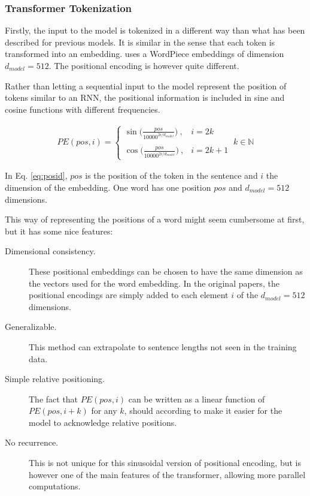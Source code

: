 \subsubsection{Transformer Tokenization}\label{sec:transtok}

Firstly, the input to the model is tokenized in a different way than what has been described for previous models. It is similar in the sense that each token is transformed into an embedding. \citet{NIPS2017_7181} uses a WordPiece embeddings of dimension $d_{model} = 512$. The positional encoding is however quite different. 

Rather than letting a sequential input to the model represent the position of tokens similar to an RNN, the positional information is included in sine and cosine functions with different frequencies. 

\begin{align}
    PE(pos,i) = \begin{cases}
    \sin\displaystyle{\Big(\frac{pos}{10000^{2i/d_{model}}}\Big)} \ , & i = 2k \\
    \\
    \cos\displaystyle{\Big(\frac{pos}{10000^{2i/d_{model}}}\Big) }\ , & i = 2k + 1 
    \end{cases} \   k \in \mathbb{N}
    \label{eq:posid}
\end{align}

In Eq. \ref{eq:posid}, $pos$ is the position of the token in the sentence and $i$ the dimension of the embedding. One word has one position $pos$ and $d_{model} = 512$ dimensions.

This way of representing the positions of a word might seem cumbersome at first, but it has some nice features: 

\begin{description}
    \item[Dimensional consistency.] These positional embeddings can be chosen to have the same dimension as the vectors used for the word embedding. In the original papers, the positional encodings are simply added to each element $i$ of the $d_{model} = 512$ dimensions. 
    \item[Generalizable.] This method can extrapolate to sentence lengths not seen in the training data. 
    \item[Simple relative positioning.] The fact that $PE(pos, i)$ can be written as a linear function of $PE(pos, i + k)$ for any $k$, should according to \citet{NIPS2017_7181} make it easier for the model to acknowledge relative positions. 
    \item[No recurrence.] This is not unique for this sinusoidal version of positional encoding, but is however one of the main features of the transformer, allowing more parallel computations. 
\end{description}

